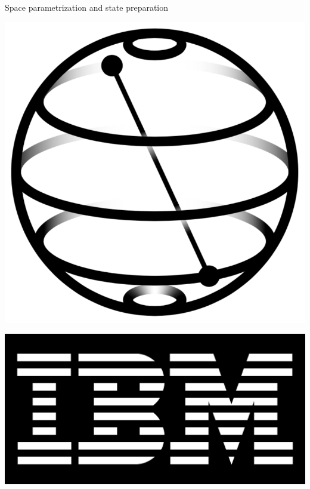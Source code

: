 \begin{frame}{Space parametrization and state preparation}
\begin{multicols}{2}
		\begin{center}
			\includegraphics[width=.2\paperwidth]{Figures/qiskit}
		\end{center}
		\begin{center}
			\includegraphics[width=.1\paperwidth]{Figures/ibm}
		\end{center}

	\end{multicols}

\end{frame}


